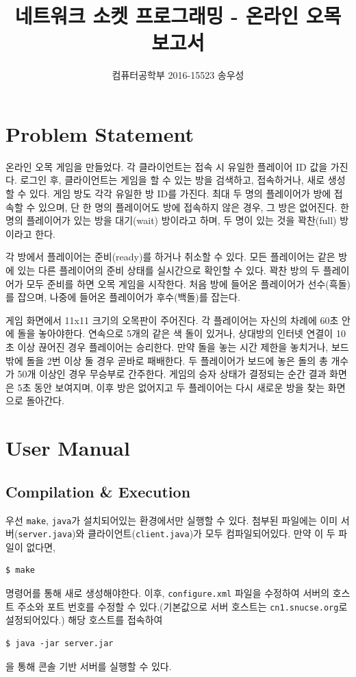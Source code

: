 \documentclass[a4paper, 10pt]{article}
\title{네트워크 소켓 프로그래밍 - 온라인 오목 보고서}
\author{컴퓨터공학부 2016-15523 송우성}
\begin{document}
\maketitle

\section{Problem Statement}
온라인 오목 게임을 만들었다. 각 클라이언트는 접속 시 유일한 플레이어 ID 값을
가진다. 로그인 후, 클라이언트는 게임을 할 수 있는 방을 검색하고, 접속하거나, 새로
생성할 수 있다. 게임 방도 각각 유일한 방 ID를 가진다. 최대 두 명의 플레이어가 방에 접속할
수 있으며, 단 한 명의 플레이어도 방에 접속하지 않은 경우, 그 방은 없어진다. 한
명의 플레이어가 있는 방을 대기(wait) 방이라고 하며, 두 명이 있는 것을 꽉찬(full)
방이라고 한다.

각 방에서 플레이어는 준비(ready)를 하거나 취소할 수 있다. 모든 플레이어는 같은
방에 있는 다른 플레이어의 준비 상태를 실시간으로 확인할 수 있다. 꽉찬 방의 두
플레이어가 모두 준비를 하면 오목 게임을 시작한다. 처음 방에 들어온 플레이어가
선수(흑돌)를 잡으며, 나중에 들어온 플레이어가 후수(백돌)를 잡는다.

게임 화면에서 11x11 크기의 오목판이 주어진다. 각 플레이어는 자신의 차례에
60초 안에 돌을 놓아야한다. 연속으로 5개의 같은 색 돌이 있거나, 상대방의
인터넷 연결이 10초 이상 끊어진 경우 플레이어는 승리한다. 만약 돌을 놓는 시간
제한을 놓치거나, 보드 밖에 돌을 2번 이상 둘 경우 곧바로 패배한다. 두 플레이어가
보드에 놓은 돌의 총 개수가 50개 이상인 경우 무승부로 간주한다. 게임의 승자
상태가 결정되는 순간 결과 화면은 5초 동안 보여지며, 이후 방은 없어지고
두 플레이어는 다시 새로운 방을 찾는 화면으로 돌아간다.

\section{User Manual}
\subsection{Compilation \& Execution}
우선 \texttt{make}, \texttt{java}가 설치되어있는 환경에서만 실행할 수 있다.
첨부된 파일에는 이미 서버(\texttt{server.java})와 클라이언트(\texttt{client.java})가
모두 컴파일되어있다. 만약 이 두 파일이 없다면,
\begin{Verbatim}[tabsize=4,xleftmargin=2em]
$ make
\end{Verbatim}
명령어를 통해 새로 생성해야한다. 이후, \texttt{configure.xml} 파일을 수정하여
서버의 호스트 주소와 포트 번호를 수정할 수 있다.(기본값으로 서버 호스트는
\texttt{cn1.snucse.org}로 설정되어있다.) 해당 호스트를 접속하여
\begin{Verbatim}[tabsize=4,xleftmargin=2em]
$ java -jar server.jar
\end{Verbatim}
을 통해 콘솔 기반 서버를 실행할 수 있다.
\end{document}
